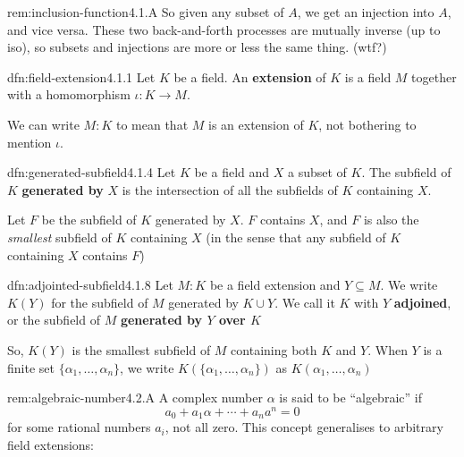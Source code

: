 \documentclass[landscape, 8pt]{extarticle}
\begin{document}
\begin{multicols}{3}
\begin{rem}{rem:inclusion-function}{4.1.A}
    So given any subset of $A$, we get an injection into $A$, and vice versa. These two back-and-forth processes are mutually inverse (up to iso), so subsets and injections are more or less the same thing. (wtf?)
\end{rem}


\begin{dfn}{dfn:field-extension}{4.1.1}
    Let $K$ be a field. An \textbf{extension} of $K$ is a field $M$ together with a homomorphism $\iota : K \to M$.

    We can write $M : K$ to mean that $M$ is an extension of $K$, not bothering to mention $\iota$.
\end{dfn}


\begin{dfn}{dfn:generated-subfield}{4.1.4}
    Let $K$ be a field and $X$ a subset of $K$. The subfield of $K$ \textbf{generated by} $X$ is the intersection of all the subfields of $K$ containing $X$.

    Let $F$ be the subfield of $K$ generated by $X$. $F$ contains $X$, and $F$ is also the \textit{smallest} subfield of $K$ containing $X$ (in the sense that any subfield of $K$ containing $X$ contains $F$)
\end{dfn}


\begin{dfn}{dfn:adjointed-subfield}{4.1.8}
    Let $M : K$ be a field extension and $Y \subseteq M$. We write $K(Y)$ for the subfield of $M$ generated by $K \cup Y$. We call it $K$ with $Y$ \textbf{adjoined}, or the subfield of $M$ \textbf{generated by $Y$ over $K$}

    \longrule{0.08ex}
    So, $K(Y)$ is the smallest subfield of $M$ containing both $K$ and $Y$. When $Y$ is a finite set $\{\alpha_{1},\dots,\alpha_{n}\}$, we write $K(\{\alpha_{1},\dots,\alpha_{n}\})$ as $K(\alpha_{1},\dots,\alpha_{n})$
\end{dfn}



\begin{rem}{rem:algebraic-number}{4.2.A}
    A complex number $\alpha$ is said to be ``algebraic'' if
    \[a_{0} + a_{1}\alpha + \cdots + a_{n}a^{n} = 0\]
    for some rational numbers $a_{i}$, not all zero. This concept generalises to arbitrary field extensions:
\end{rem}


\end{multicols}
\end{document}
